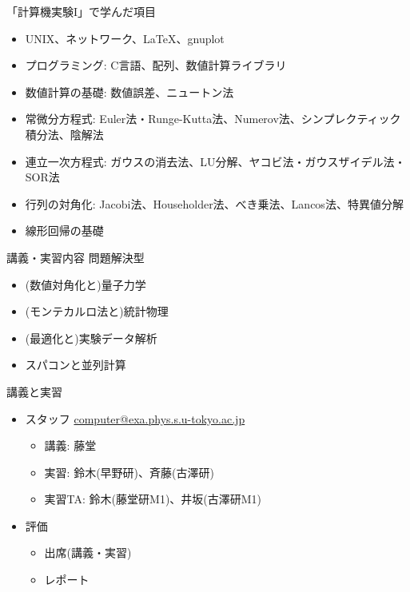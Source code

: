 \begin{frame}[t]{「計算機実験I」で学んだ項目}
  \begin{itemize}
  \item UNIX、ネットワーク、\LaTeX、gnuplot
  \item プログラミング: C言語、配列、数値計算ライブラリ
  \item 数値計算の基礎: 数値誤差、ニュートン法
  \item 常微分方程式: Euler法・Runge-Kutta法、Numerov法、シンプレクティック積分法、陰解法
  \item 連立一次方程式: ガウスの消去法、LU分解、ヤコビ法・ガウスザイデル法・SOR法
  \item 行列の対角化: Jacobi法、Householder法、べき乗法、Lancos法、特異値分解
  \item 線形回帰の基礎
  \end{itemize}
\end{frame}

\begin{frame}[t]{講義・実習内容}
  問題解決型
  \begin{itemize}
    \setlength{\itemsep}{1em}
  \item (数値対角化と)量子力学
  \item (モンテカルロ法と)統計物理
  \item (最適化と)実験データ解析
  \item {\color{gray}スパコンと並列計算}
  \end{itemize}
\end{frame}

\begin{frame}[t,fragile]{講義と実習}
  \begin{itemize}
    \setlength{\itemsep}{1em}
  \item スタッフ \href{mailto:computer@exa.phys.s.u-tokyo.ac.jp}{computer@exa.phys.s.u-tokyo.ac.jp}
    \begin{itemize}
    \item 講義: 藤堂
    \item 実習: 鈴木(早野研)、斉藤(古澤研)
    \item 実習TA: 鈴木(藤堂研M1)、井坂(古澤研M1)
    \end{itemize}
  \item 評価
    \begin{itemize}
    \item 出席(講義・実習)
    \item レポート
    \end{itemize}    
  \end{itemize}    
\end{frame}

